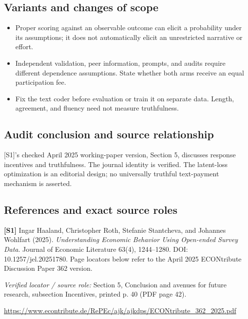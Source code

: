 \documentclass[11pt,a4paper]{article}
\begin{document}
\subsection*{Variants and changes of scope}

\begin{itemize}
\item Proper scoring against an observable outcome can elicit a probability under its assumptions; it does not automatically elicit an unrestricted narrative or effort.
\item Independent validation, peer information, prompts, and audits require different dependence assumptions. State whether both arms receive an equal participation fee.
\item Fix the text coder before evaluation or train it on separate data. Length, agreement, and fluency need not measure truthfulness.
\end{itemize}

\subsection*{Audit conclusion and source relationship}

[S1]'s checked April 2025 working-paper version, Section 5, discusses response incentives and truthfulness. The journal identity is verified. The latent-loss optimization is an editorial design; no universally truthful text-payment mechanism is asserted.

\subsection*{References and exact source roles}

{\footnotesize\raggedright
\par\noindent\textbf{[S1]} Ingar Haaland, Christopher Roth, Stefanie Stantcheva, and Johannes Wohlfart (2025). \emph{Understanding Economic Behavior Using Open-ended Survey Data}. Journal of Economic Literature 63(4), 1244–1280. DOI: 10.1257/jel.20251780. Page locators below refer to the April 2025 ECONtribute Discussion Paper 362 version.\par \textit{Verified locator / source role:} Section 5, Conclusion and avenues for future research, subsection Incentives, printed p. 40 (PDF page 42).\par \url{https://www.econtribute.de/RePEc/ajk/ajkdps/ECONtribute_362_2025.pdf}\par\smallskip
}
\end{document}
